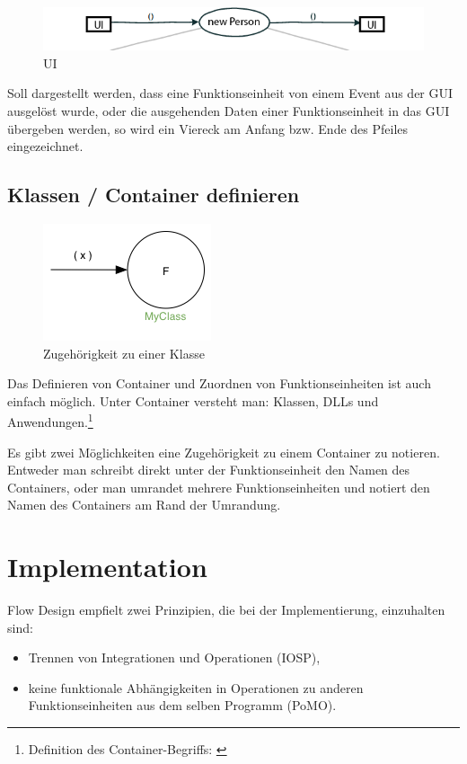 \begin{figure}[H]
	\centering
		\includegraphics[width=.9\linewidth]{./img/diagramUI.png}
	\caption{UI}
\end{figure}


Soll dargestellt werden, dass eine Funktionseinheit von einem Event aus der GUI ausgelöst
wurde, oder die ausgehenden Daten einer Funktionseinheit in das GUI übergeben werden, so
wird ein Viereck am Anfang bzw. Ende des Pfeiles eingezeichnet.

\section{Klassen / Container definieren}


\begin{figure}[H]
	\centering
	\includegraphics[width=.4\linewidth]{./img/diagramClass.png}
	\caption{Zugehörigkeit zu einer Klasse}
\end{figure}


Das Definieren von Container und Zuordnen von Funktionseinheiten ist auch
einfach möglich. Unter Container versteht man: Klassen, DLLs und Anwendungen.\footnote{Definition des Container-Begriffs: \cite[S. 50 ff.]{schummelzettel}}

Es gibt zwei Möglichkeiten eine Zugehörigkeit zu einem Container zu notieren.
Entweder man schreibt direkt unter der Funktionseinheit den Namen des
Containers, oder man umrandet mehrere Funktionseinheiten und notiert den Namen
des Containers am Rand der Umrandung.

\chapter{Implementation}

Flow Design empfielt zwei Prinzipien, die bei der Implementierung,
einzuhalten sind:

\begin{itemize}
\item Trennen von Integrationen und Operationen (IOSP),
\item keine funktionale Abhängigkeiten in Operationen zu anderen Funktionseinheiten aus dem selben Programm (PoMO).
\end{itemize}

